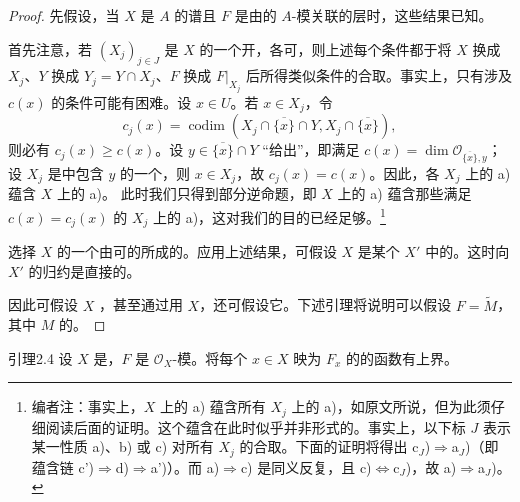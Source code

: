 \begin{proof}
先假设，当 $X$ 是 $A$ 的谱且 $F$ 是由的 $A$-模关联的层时，这些结果已知。

首先注意，若 $(X_j)_{j\in J}$ 是 $X$ 的一个开，各可，则上述每个条件都于将 $X$ 换成 $X_j$、$Y$ 换成 $Y_j=Y\cap X_j$、$F$ 换成 $F|_{X_j}$ 后所得类似条件的合取。事实上，只有涉及 $c(x)$ 的条件可能有困难。设 $x\in U$。若 $x\in X_j$，令
\[c_j(x)=\operatorname{codim}(X_j\cap\overline{\{x\}}\cap Y,X_j\cap\overline{\{x\}}),\]
则必有 $c_j(x)\geq c(x)$。设 $y\in\overline{\{x\}}\cap Y$ “给出”，即满足 $c(x)=\dim\mathscr O_{\overline{\{x\}},y}$；设 $X_j$ 是中包含 $y$ 的一个，则 $x\in X_j$，故 $c_j(x)=c(x)$。因此，各 $X_j$ 上的 a) 蕴含 $X$ 上的 a)。
此时我们只得到部分逆命题，即 $X$ 上的 a) 蕴含那些满足 $c(x)=c_j(x)$ 的 $X_j$ 上的 a)，这对我们的目的已经足够。\footnote{编者注：事实上，$X$ 上的 a) 蕴含所有 $X_j$ 上的 a)，如原文所说，但为此须仔细阅读后面的证明。这个蕴含在此时似乎并非形式的。事实上，以下标 $J$ 表示某一性质 a)、b) 或 c) 对所有 $X_j$ 的合取。下面的证明将得出 c$_J$)$\Rightarrow$a$_J$)（即蕴含链 c')$\Rightarrow$d)$\Rightarrow$a')）。而 a)$\Rightarrow$c) 是同义反复，且 c)$\Leftrightarrow$c$_J$)，故 a)$\Rightarrow$a$_J$)。}

选择 $X$ 的一个由可的所成的。应用上述结果，可假设 $X$ 是某个 $X'$ 中的。这时向 $X'$ 的归约是直接的。

因此可假设 $X$ ，甚至通过用 $X$，还可假设它。下述引理将说明可以假设 $F=\widetilde M$，其中 $M$ 的。
\end{proof}
\begin{SGAresult}{引理}{2.4}
设 $X$ 是，$F$ 是 $\mathscr O_X$-模。将每个 $x\in X$ 映为 $F_x$ 的的函数有上界。
\end{SGAresult}

